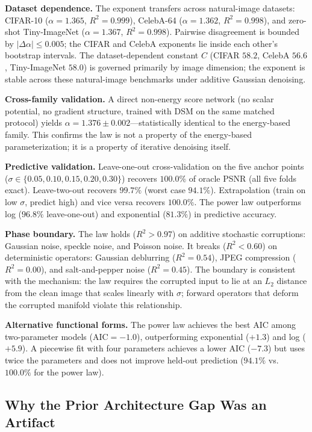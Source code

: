 \documentclass[letterpaper]{article}
\begin{document}
\textbf{Dataset dependence.} The exponent transfers across natural-image datasets: CIFAR-10 ($\alpha{=}1.365$, $R^2{=}0.999$), CelebA-64 ($\alpha{=}1.362$, $R^2{=}0.998$), and zero-shot Tiny-ImageNet ($\alpha{=}1.367$, $R^2{=}0.998$). Pairwise disagreement is bounded by $|\Delta\alpha| \leq 0.005$; the CIFAR and CelebA exponents lie inside each other's bootstrap intervals. The dataset-dependent constant $C$ (CIFAR $58.2$, CelebA $56.6$, Tiny-ImageNet $58.0$) is governed primarily by image dimension; the exponent is stable across these natural-image benchmarks under additive Gaussian denoising.

\textbf{Cross-family validation.} A direct non-energy score network (no scalar potential, no gradient structure, trained with DSM on the same matched protocol) yields $\alpha = 1.376 \pm 0.002$---statistically identical to the energy-based family. This confirms the law is not a property of the energy-based parameterization; it is a property of iterative denoising itself.

\textbf{Predictive validation.} Leave-one-out cross-validation on the five anchor points ($\sigma \in \{0.05, 0.10, 0.15, 0.20, 0.30\}$) recovers $100.0\%$ of oracle PSNR (all five folds exact). Leave-two-out recovers $99.7\%$ (worst case $94.1\%$). Extrapolation (train on low $\sigma$, predict high) and vice versa recovers $100.0\%$. The power law outperforms log ($96.8\%$ leave-one-out) and exponential ($81.3\%$) in predictive accuracy.

\textbf{Phase boundary.} The law holds ($R^2 > 0.97$) on additive stochastic corruptions: Gaussian noise, speckle noise, and Poisson noise. It breaks ($R^2 < 0.60$) on deterministic operators: Gaussian deblurring ($R^2{=}0.54$), JPEG compression ($R^2{=}0.00$), and salt-and-pepper noise ($R^2{=}0.45$). The boundary is consistent with the mechanism: the law requires the corrupted input to lie at an $L_2$ distance from the clean image that scales linearly with $\sigma$; forward operators that deform the corrupted manifold violate this relationship.

\textbf{Alternative functional forms.} The power law achieves the best AIC among two-parameter models ($\text{AIC} = -1.0$), outperforming exponential ($+1.3$) and log ($+5.9$). A piecewise fit with four parameters achieves a lower AIC ($-7.3$) but uses twice the parameters and does not improve held-out prediction ($94.1\%$ vs.~$100.0\%$ for the power law).

\subsection{Why the Prior Architecture Gap Was an Artifact}
\label{sec:artifact}
\end{document}
